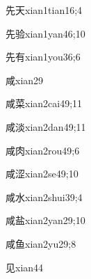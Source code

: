 \begin{verbete}{先天}{xian1tian1}{6;4}
\end{verbete}

\begin{verbete}{先验}{xian1yan4}{6;10}
\end{verbete}

\begin{verbete}{先有}{xian1you3}{6;6}
\end{verbete}

\begin{verbete}{咸}{xian2}{9}
\end{verbete}

\begin{verbete}{咸菜}{xian2cai4}{9;11}
\end{verbete}

\begin{verbete}{咸淡}{xian2dan4}{9;11}
\end{verbete}

\begin{verbete}{咸肉}{xian2rou4}{9;6}
\end{verbete}

\begin{verbete}{咸涩}{xian2se4}{9;10}
\end{verbete}

\begin{verbete}{咸水}{xian2shui3}{9;4}
\end{verbete}

\begin{verbete}{咸盐}{xian2yan2}{9;10}
\end{verbete}

\begin{verbete}{咸鱼}{xian2yu2}{9;8}
\end{verbete}

\begin{verbete}{见}{xian4}{4}
\end{verbete}

